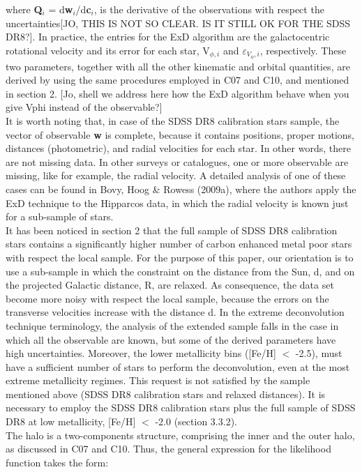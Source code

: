 \documentclass[apj]{emulateapj}
\begin{document}
where \textbf{Q$_{i}$} = d\textbf{w$_{i}$}/d\textbf{c$_{i}$}, is the derivative of the observations with respect the uncertainties[JO, THIS IS NOT SO CLEAR. IS IT STILL OK FOR THE SDSS DR8?].
In practice, the entries for the ExD algorithm are the galactocentric rotational velocity and its error for each star, V$_{\phi,i}$ and $\varepsilon_{V_{\phi},i}$, respectively. These two parameters, together with all the other kinematic and orbital quantities, are derived by using the same procedures employed in C07 and C10, and mentioned in section 2.
[Jo, shell we address here how the ExD algorithm behave when you give Vphi instead of the observable?]\\
It is worth noting that, in case of the SDSS DR8 calibration stars sample, the vector of observable \textbf{w} is complete, because it contains positions, proper motions, distances (photometric), and radial velocities for each star. In other words, there are not missing data. In other surveys or catalogues, one or more observable are missing, like for example, the radial velocity. A detailed analysis of one of these cases can be found in Bovy, Hoog \& Rowess (2009a), where the authors apply the ExD technique to the Hipparcos data, in which the radial velocity is known just for a sub-sample of stars. \\It has been noticed in section 2 that the full sample of SDSS DR8 calibration stars contains a significantly higher number of carbon enhanced metal poor stars with respect the local sample. For the purpose of this paper, our orientation is to use a sub-sample in which the constraint on the distance from the Sun, d, and on the projected Galactic distance, R, are relaxed. As consequence, the data set become more noisy with respect the local sample, because the errors on the transverse velocities increase with the distance d. In the extreme deconvolution technique terminology, the analysis of the extended sample falls in the case in which all the observable are known, but some of the derived parameters have high uncertainties. Moreover, the lower metallicity bins ([Fe/H] $<$ -2.5), must have a sufficient number of stars to perform the deconvolution, even at the most extreme metallicity regimes. This request is not satisfied by the sample mentioned above (SDSS DR8 calibration stars and relaxed distances). It is necessary to employ the SDSS DR8 calibration stars plus the full sample of SDSS DR8 at low metallicity, [Fe/H] $<$ -2.0 (section 3.3.2).\\

The halo is a two-components structure, comprising the inner and the outer halo, as discussed in C07 and C10.
Thus, the general expression for the likelihood function takes the form:
\end{document}
